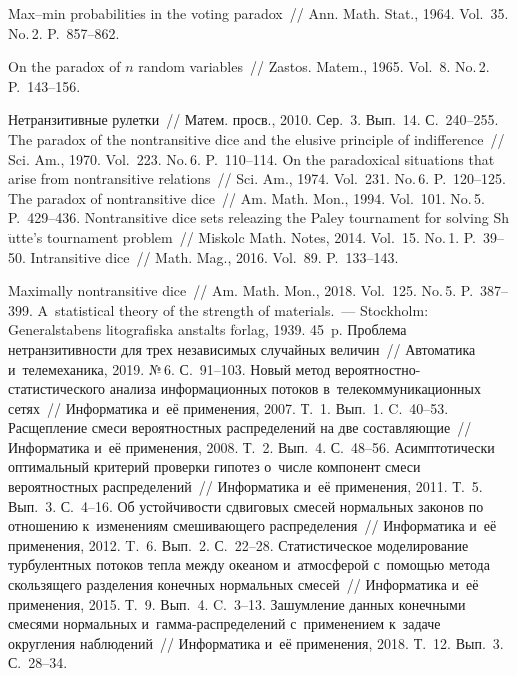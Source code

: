 \begin{multicols}{2}
{{\begin{thebibliography}{99}
 Max--min probabilities in the voting paradox~// 
Ann. Math. Stat., 1964. Vol.~35. No.\,2. P.~857--862.

On the paradox of $n$ random variables~// Zastos. Matem.,
1965. Vol.~8. No.\,2. P.~143--156.

 Нетранзитивные рулетки~// Матем. просв., 2010. Сер.~3. Вып.~14. 
С.~240--255.
 The paradox of the nontransitive dice and the
elusive principle of indifference~// Sci. Am., 1970. Vol.~223. No.\,6. P.~110--114.
  On the paradoxical situations that arise from 
nontransitive relations~//
Sci. Am., 1974. Vol.~231. No.\,6. P.~120--125.
 The paradox of nontransitive dice~// Am. Math. Mon., 1994.
Vol.~101. No.\,5. P.~429--436.
 Nontransitive dice sets releazing the Paley tournament for 
solving Sh$\ddot{\mbox{u}}$tte's
tournament problem~// Miskolc Math. Notes, 2014. Vol.~15. No.\,1. P.~39--50.
Intransitive dice~// Math. Mag., 2016. Vol.~89. P.~133--143.
{

}
 Maximally nontransitive dice~// 
Am. Math. Mon., 2018. Vol.~125. No.\,5. P.~387--399.
 A~statistical theory of the strength of materials.~--- 
Stockholm: Generalstabens litografiska anstalts f$\ddot{\mbox{o}}$rlag, 1939. 45~p.
 Проблема нетранзитивности для трех независимых
случайных величин~// Автоматика и~телемеханика, 2019. №\,6. С.~91--103.
Новый метод ве\-ро\-ят\-но\-ст\-но-ста\-ти\-сти\-че\-ско\-го 
анализа информационных потоков в~телекоммуникационных сетях~// Информатика и~её 
применения, 2007. Т.~1. Вып.~1. C.~40--53.
Расщепление смеси вероятностных распределений на две составляющие~// Информатика 
и~её применения, 2008. Т.~2. Вып.~4. С.~48--56.
 Асимптотически оптимальный критерий проверки гипотез о~чис\-ле 
 компонент смеси вероятностных распределений~// Информатика и~её 
применения, 2011. Т.~5. Вып.~3. С.~4--16.
 Об устойчивости сдвиговых смесей 
нормальных законов по отношению к~изменениям смешивающего распределения~// 
Информатика и~её 
применения, 2012. T.~6. Вып.~2. С.~22--28.
Статистическое моделирование турбулентных потоков тепла между океаном 
и~атмосферой с~по\-мощью
метода скользящего разделения конечных нормальных смесей~// 
Информатика и~её применения, 2015. Т.~9. Вып.~4.
C.~3--13.
Зашумление данных конечными смесями нормальных и~гам\-ма-рас\-пре\-де\-ле\-ний 
с~применением к~задаче округления наблюдений~//
Информатика и~её применения, 2018. Т.~12. Вып.~3. С.~28--34.
 \end{thebibliography}

}}
\end{multicols}
